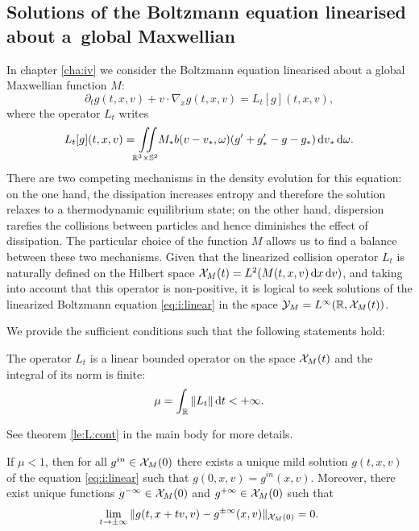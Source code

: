 \subsection{Solutions of the Boltzmann equation linearised about a~global Maxwellian} %
\label{sub:global_solutions_of_the_linearized_boltzmann_equation}
In chapter \ref{cha:iv} we consider the Boltzmann equation linearised about a global Maxwellian function $M$:
\begin{equation}
	\partial_t g(t,x,v)+v\cdot \nabla_x g(t,x,v)=L_t[g](t,x,v),
	\label{eq:i:linear}
\end{equation}
where the operator $L_t$ writes
\begin{equation}
	\label{eq:i:Lt}
	L_t[g](t,x,v) = {\iint\limits_{\mathbb R^3\times\mathbb S^2}} M_* b(v-v_*,\omega)(g'+g'_*-g-g_*){\,\mathrm{d} v}_*{\,\mathrm{d} \omega}.
\end{equation}
There are two competing mechanisms in the density evolution for this equation: on the one hand, the dissipation increases entropy and therefore the solution relaxes to a thermodynamic equilibrium state; on the other hand, dispersion rarefies the collisions between particles and hence diminishes the effect of dissipation. The particular choice of the function $M$ allows us to find a balance between these two mechanisms.
Given that the linearized collision operator $L_t$ is naturally defined on the Hilbert space ${\mathcal X_M(t)}=L^2(M(t,x,v){\,\mathrm{d} x}{\,\mathrm{d} v})$, and taking into account that this operator is non-positive, it is logical to seek solutions of the linearized Boltzmann equation \eqref{eq:i:linear} in the space ${\mathcal Y_M} = L^{\infty}({\mathbb {R}},{\mathcal X_M(t)})$.

We provide the sufficient conditions such that the following statements hold:
\begin{theorem*}
	The operator $L_t$ is a linear bounded operator on the space ${\mathcal X_M(t)}$ and the integral of its norm is finite:
	\begin{equation}
		\label{eq:i:mu}
		\mu = \int_{{\mathbb {R}}} \|L_t\|{\,\mathrm dt}<+\infty.
	\end{equation}
\end{theorem*}
\noindent See theorem \ref{le:L:cont} in the main body for more details.
\begin{theorem*}
	If $\mu<1$, then for all $g^{in}\in {\mathcal X_M(0)}$ there exists a unique mild solution $g(t,x,v)$ of the equation \eqref{eq:i:linear} such that $g(0,x,v)=g^{in}(x,v)$. Moreover, there exist unique functions ${g^{-\infty}}\in{\mathcal X_M(0)}$ and ${g^{+\infty}}\in{\mathcal X_M(0)}$ such that \begin{equation*}
		\lim_{t\to\pm \infty} \|g(t,x+tv,v)-g^{\pm \infty}(x,v)\|_{{\mathcal X_M(0)}}=0.
	\end{equation*}
\end{theorem*}

